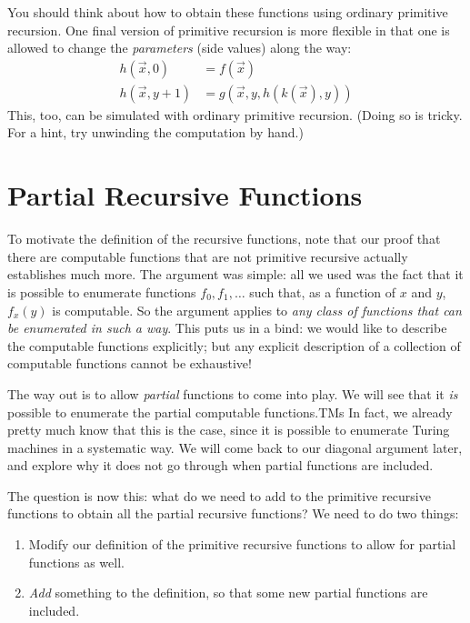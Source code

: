 \documentclass[10pt,a4paper]{article}
\theoremstyle{plain}
\theoremstyle{definition}
\theoremstyle{remark}
\newcommand*{\olfileid}[3]{}
\newcommand*{\olsection}[1]{\section*{#1}}
\providecommand{\iftag}[1]{#1}
\providecommand{\iftag}{}
\begin{document}
You should think about how to obtain these functions using ordinary
primitive recursion. One final version of primitive recursion is more
flexible in that one is allowed to change the \emph{parameters} (side
values) along the way:
\begin{align*}
h(\vec x, 0) & = f(\vec x) \\
h(\vec x, y+1) & = g(\vec x, y, h(k(\vec x), y))
\end{align*}
This, too, can be simulated with ordinary primitive recursion. (Doing
so is tricky. For a hint, try unwinding the computation by hand.)





\olfileid{cmp}{rec}{par}
\olsection{Partial Recursive Functions}


To motivate the definition of the recursive functions, note that our
proof that there are computable functions that are not primitive
recursive actually establishes much more. The argument was
simple: all we used was the fact that it is possible to enumerate
functions $f_0,f_1,\dots$ such that, as a function of $x$ and $y$,
$f_x(y)$ is computable. So the argument applies to \emph{any class of
  functions that can be enumerated in such a way}. This puts us in a
bind: we would like to describe the computable functions explicitly;
but any explicit description of a collection of computable functions
cannot be exhaustive!

The way out is to allow \emph{partial} functions to come into play. We
will see that it \emph{is} possible to enumerate the partial
computable functions.\iftag{TMs}{ In fact, we already pretty much know
  that this is the case, since it is possible to enumerate Turing
  machines in a systematic way.}{} We will come back to our diagonal
argument later, and explore why it does not go through when partial
functions are included.

The question is now this: what do we need to add to the primitive
recursive functions to obtain all the partial recursive functions? We
need to do two things:
\begin{enumerate}
\item Modify our definition of the primitive recursive functions to
  allow for partial functions as well.
\item \emph{Add} something to the definition, so that some new partial
  functions are included.
\end{enumerate}
\end{document}
